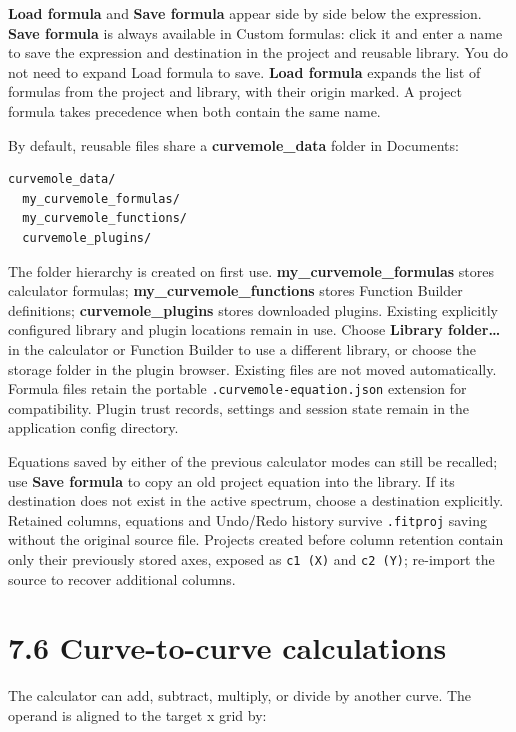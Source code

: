 \documentclass[
  10pt,
  a4paper,
  oneside]{scrreprt}
\begin{document}
\textbf{Load formula} and \textbf{Save formula} appear side by side
below the expression. \textbf{Save formula} is always available in
Custom formulas: click it and enter a name to save the expression and
destination in the project and reusable library. You do not need to
expand Load formula to save. \textbf{Load formula} expands the list of
formulas from the project and library, with their origin marked. A
project formula takes precedence when both contain the same name.

By default, reusable files share a \textbf{curvemole\_data} folder in
Documents:

\begin{verbatim}
curvemole_data/
  my_curvemole_formulas/
  my_curvemole_functions/
  curvemole_plugins/
\end{verbatim}

The folder hierarchy is created on first use.
\textbf{my\_curvemole\_formulas} stores calculator formulas;
\textbf{my\_curvemole\_functions} stores Function Builder definitions;
\textbf{curvemole\_plugins} stores downloaded plugins. Existing
explicitly configured library and plugin locations remain in use. Choose
\textbf{Library folder\ldots{}} in the calculator or Function Builder to
use a different library, or choose the storage folder in the plugin
browser. Existing files are not moved automatically. Formula files
retain the portable \texttt{.curvemole-equation.json} extension for
compatibility. Plugin trust records, settings and session state remain
in the application config directory.

Equations saved by either of the previous calculator modes can still be
recalled; use \textbf{Save formula} to copy an old project equation into
the library. If its destination does not exist in the active spectrum,
choose a destination explicitly. Retained columns, equations and
Undo/Redo history survive \texttt{.fitproj} saving without the original
source file. Projects created before column retention contain only their
previously stored axes, exposed as \texttt{c1\ (X)} and
\texttt{c2\ (Y)}; re-import the source to recover additional columns.

\hypertarget{curve-to-curve-calculations}{%
\section{7.6 Curve-to-curve
calculations}\label{curve-to-curve-calculations}}

The calculator can add, subtract, multiply, or divide by another curve.
The operand is aligned to the target x grid by:
\end{document}
